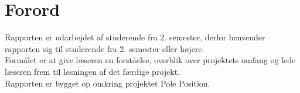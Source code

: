 \renewcommand{\abstractname}{Forord}
\section{Forord}
Rapporten er udarbejdet af studerende fra 2. semester, derfor henvender rapporten sig til studerende fra 2. semester eller højere. \\
Formålet er at give læseren en forståelse, overblik over projektets omfang og lede læseren frem til løsningen af det færdige projekt.\\
Rapporten er bygget op omkring projektet Pole Position.\\ 
